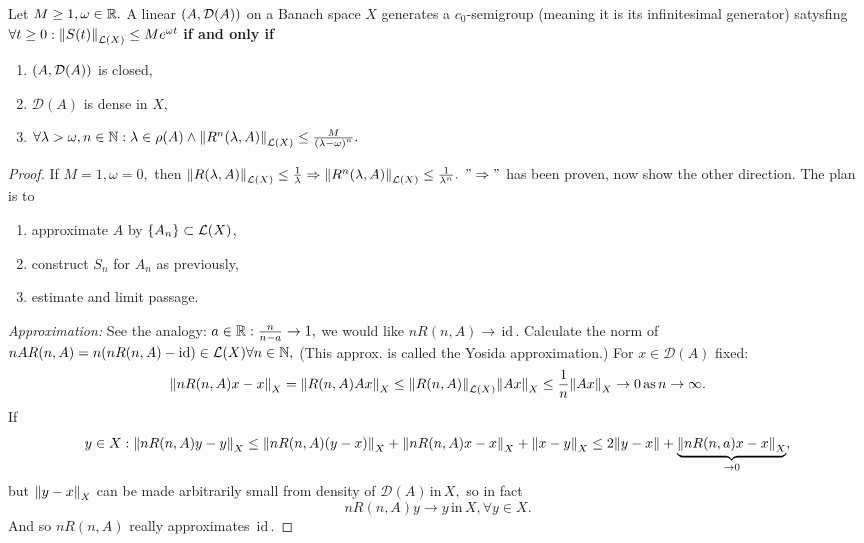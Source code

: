 \documentclass{article}
\begin{document}
\begin{theorem}
	Let $M \geq 1, \omega \in {\mathbb R}.$ A linear $\qty(A, \mathcal{D}(A))$ on a Banach space $X$ generates a $c_0$-semigroup (meaning it is its infinitesimal generator) satysfing $\forall t \geq 0: \norm{S(t)}_{\mathcal{L}(X)} \leq Me^{\omega t}$ \textbf{if and only if}
	\begin{enumerate}
		\item $\qty(A, \mathcal{D}(A))$ is closed,
		\item $\mathcal{D}(A)$ is dense in $X$,
		\item $\forall \lambda > \omega, n \in {\mathbb N}: \lambda \in \rho(A) \wedge \norm{R^n\qty(\lambda,A)}_{\mathcal{L}(X)} \leq \frac{M}{\qty(\lambda-\omega)^n}.$
	\end{enumerate}
\end{theorem}
\begin{proof}
	If $M = 1, \omega = 0, $ then $\norm{R\qty(\lambda,A)}_{\mathcal{L}(X)}\leq \frac{1}{\lambda} \Rightarrow \norm{R^n\qty(\lambda, A)}_{\mathcal{L}(X)} \leq \frac{1}{\lambda^n}.$
	$"\Rightarrow"$ has been proven, now show the other direction. The plan is to 
\begin{enumerate}
	\item approximate $A$ by $\qty{A_n}\subset \mathcal{L}(X)$,
	\item construct $S_n$ for $A_n$ as previously,
	\item estimate and limit passage.
\end{enumerate}

\textit{Approximation:}
See the analogy: $a \in {\mathbb R}: \frac{n}{n-a} \to 1,$ we would like $n R(n,A) \to \, \text{id} \,.$
Calculate the norm of $nAR(n,A) = n\qty(nR(n,A)- \text{id}) \in \mathcal{L}(X) \forall n \in {\mathbb N},$ (This approx. is called the Yosida approximation.) For $x \in \mathcal{D}(A)$ fixed:
\[
	\norm{n R(n,A)x - x}_X = \norm{R(n,A)Ax}_X \leq \norm{R(n,A)}_{\mathcal{L}(X)} \norm{Ax}_X \leq \frac{1}{n}\norm{Ax}_X \to 0 \, \text{as} \, n\to \infty.
\]
If
\[
	y \in X: \norm{nR\qty(n,A)y -y}_X \leq \norm{nR(n,A)(y-x)}_X + \norm{nR(n,A)x-x}_X + \norm{x-y}_X \leq 2 \norm{y-x} + \underbrace{\norm{nR(n,a)x -x}_X}_{\to 0},
\]
but $\norm{y-x}_X$ can be made arbitrarily small from density of $\mathcal{D}(A) \, \text{in} \,X, $ so in fact
\[
	n R(n,A)y \to y \, \text{in} \, X, \forall y \in X.
\]
And so $n R(n,A)$ really approximates $\, \text{id} \,.$ 


\end{proof}
\end{document}
